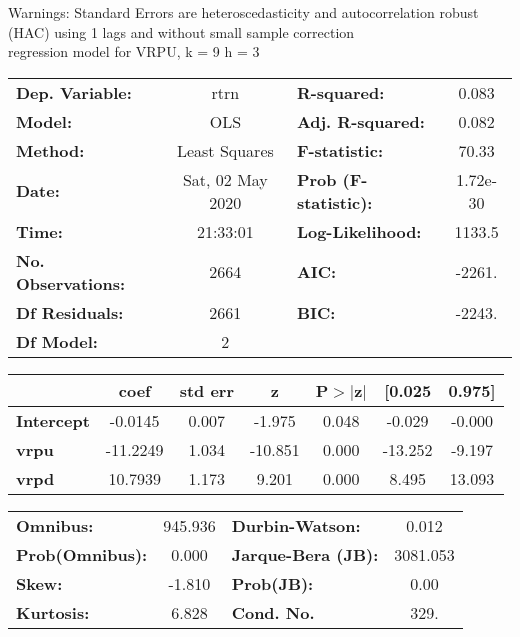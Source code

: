 Warnings: \newline
 [1] Standard Errors are heteroscedasticity and autocorrelation robust (HAC) using 1 lags and without small sample correction\\ 

regression model for VRPU, k = 9 h = 3\begin{center}
\begin{tabular}{lclc}
\toprule
\textbf{Dep. Variable:}    &       rtrn       & \textbf{  R-squared:         } &     0.083   \\
\textbf{Model:}            &       OLS        & \textbf{  Adj. R-squared:    } &     0.082   \\
\textbf{Method:}           &  Least Squares   & \textbf{  F-statistic:       } &     70.33   \\
\textbf{Date:}             & Sat, 02 May 2020 & \textbf{  Prob (F-statistic):} &  1.72e-30   \\
\textbf{Time:}             &     21:33:01     & \textbf{  Log-Likelihood:    } &    1133.5   \\
\textbf{No. Observations:} &        2664      & \textbf{  AIC:               } &    -2261.   \\
\textbf{Df Residuals:}     &        2661      & \textbf{  BIC:               } &    -2243.   \\
\textbf{Df Model:}         &           2      & \textbf{                     } &             \\
\bottomrule
\end{tabular}
\begin{tabular}{lcccccc}
                   & \textbf{coef} & \textbf{std err} & \textbf{z} & \textbf{P$> |$z$|$} & \textbf{[0.025} & \textbf{0.975]}  \\
\midrule
\textbf{Intercept} &      -0.0145  &        0.007     &    -1.975  &         0.048        &       -0.029    &       -0.000     \\
\textbf{vrpu}      &     -11.2249  &        1.034     &   -10.851  &         0.000        &      -13.252    &       -9.197     \\
\textbf{vrpd}      &      10.7939  &        1.173     &     9.201  &         0.000        &        8.495    &       13.093     \\
\bottomrule
\end{tabular}
\begin{tabular}{lclc}
\textbf{Omnibus:}       & 945.936 & \textbf{  Durbin-Watson:     } &    0.012  \\
\textbf{Prob(Omnibus):} &   0.000 & \textbf{  Jarque-Bera (JB):  } & 3081.053  \\
\textbf{Skew:}          &  -1.810 & \textbf{  Prob(JB):          } &     0.00  \\
\textbf{Kurtosis:}      &   6.828 & \textbf{  Cond. No.          } &     329.  \\
\bottomrule
\end{tabular}
\end{center}

